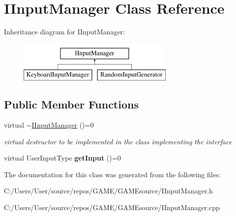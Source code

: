 \hypertarget{class_i_input_manager}{}\section{I\+Input\+Manager Class Reference}
\label{class_i_input_manager}
Inheritance diagram for I\+Input\+Manager\+:\begin{figure}[H]
\begin{center}
\leavevmode
\includegraphics[height=2.000000cm]{class_i_input_manager}
\end{center}
\end{figure}
\subsection*{Public Member Functions}
\begin{DoxyCompactItemize}
\item 
\mbox{\label{class_i_input_manager_aa81a10b1ddf305df10c4aebe6930ac86}} 
virtual \mbox{\hyperlink{class_i_input_manager_aa81a10b1ddf305df10c4aebe6930ac86}{$\sim$\+I\+Input\+Manager}} ()=0
\begin{DoxyCompactList}\small\item\em virtual destructor to be implemented in the class implementing the interface \end{DoxyCompactList}\item 
\mbox{\label{class_i_input_manager_afa367fc9694f45150aeb59039dcd4421}} 
virtual User\+Input\+Type {\bfseries get\+Input} ()=0
\end{DoxyCompactItemize}


The documentation for this class was generated from the following files\+:\begin{DoxyCompactItemize}
\item 
C\+:/\+Users/\+User/source/repos/\+G\+A\+M\+E/\+G\+A\+M\+Esource/I\+Input\+Manager.\+h\item 
C\+:/\+Users/\+User/source/repos/\+G\+A\+M\+E/\+G\+A\+M\+Esource/I\+Input\+Manager.\+cpp\end{DoxyCompactItemize}
